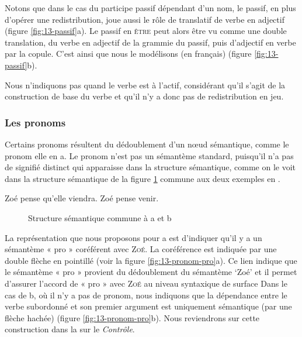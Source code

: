 Notons que dans le cas du participe passif dépendant d’un nom, le passif, en plus d’opérer une redistribution, joue aussi le rôle de translatif de verbe en adjectif (figure \ref{fig:13-passif}a). Le passif en \textsc{être} peut alors être vu comme une double translation, du verbe en adjectif de la grammie du passif, puis d’adjectif en verbe par la copule. C’est ainsi que nous le modélisons (en français) (figure \ref{fig:13-passif}b).

Nous n’indiquons pas quand le verbe est à l’actif, considérant qu’il s’agit de la construction de base du verbe et qu’il n’y a donc pas de redistribution en jeu.

\subsubsection{Les pronoms}
Certains pronoms résultent du dédoublement d’un nœud sémantique, comme le pronom elle en a. Le pronom n’est pas un sémantème standard, puisqu’il n’a pas de signifié distinct qui apparaisse dans la structure sémantique, comme on le voit dans la structure sémantique de la figure \ref{fig:13-pronom-sem} commune aux deux exemples en .

\ea\label{ex:13-pronom}
\ea Zoé pense qu’elle viendra.
\ex Zoé pense venir.\z\z

\begin{figure}
\caption{Structure sémantique commune à a et b \label{fig:13-pronom-sem}}
\end{figure}

La représentation que nous proposons pour a est d’indiquer qu’il y a un sémantème « pro » coréférent avec \textsc{Zoé}. La coréférence est indiquée par une double flèche en pointillé (voir la figure \ref{fig:13-pronom-pro}a). Ce lien indique que le sémantème « pro » provient du dédoublement du sémantème ‘Zoé’ et il permet d’assurer l’accord de « pro » avec \textsc{Zoé} au niveau syntaxique de surface Dans le cas de b, où il n’y a pas de pronom, nous indiquons que la dépendance entre le verbe subordonné et son premier argument est uniquement sémantique (par une flèche hachée) (figure \ref{fig:13-pronom-pro}b). Nous reviendrons sur cette construction dans la  sur le \textit{Contrôle}.

